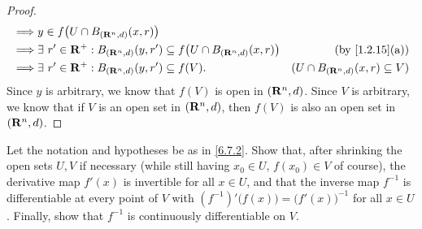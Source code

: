 \begin{proof}
\begin{align*}
    \implies & y \in f\big(U \cap B_{(\R^n, d)}(x, r)\big)                                                                                            \\
    \implies & \exists\ r' \in \R^+ : B_{(\R^n, d)}(y, r') \subseteq f\big(U \cap B_{(\R^n, d)}(x, r)\big) & \text{(by \cref{1.2.15}(a))}             \\
    \implies & \exists\ r' \in \R^+ : B_{(\R^n, d)}(y, r') \subseteq f(V).                                 & (U \cap B_{(\R^n, d)}(x, r) \subseteq V)
  \end{align*}
  Since \(y\) is arbitrary, we know that \(f(V)\) is open in \((\mathbf{R}^n, d)\).
  Since \(V\) is arbitrary, we know that if \(V\) is an open set in \((\mathbf{R}^n, d)\), then \(f(V)\) is also an open set in \((\mathbf{R}^n, d)\).
\end{proof}

\begin{exercise}\label{ex 6.7.4}
  Let the notation and hypotheses be as in \cref{6.7.2}.
  Show that, after shrinking the open sets \(U, V\) if necessary (while still having \(x_0 \in U\), \(f(x_0) \in V\) of course), the derivative map \(f'(x)\) is invertible for all \(x \in U\), and that the inverse map \(f^{-1}\) is differentiable at every point of \(V\) with \((f^{-1})' \big(f(x)\big) = \big(f'(x)\big)^{-1}\) for all \(x \in U\).
  Finally, show that \(f^{-1}\) is continuously differentiable on \(V\).
\end{exercise}